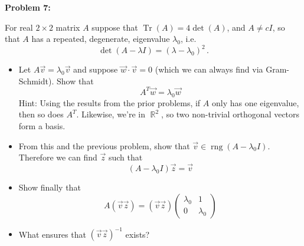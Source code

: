 \documentclass[12pt]{article}
\DeclareMathOperator{\Tr}{Tr}
\DeclareMathOperator{\RR}{\mathbb{R}}
\DeclareMathOperator{\rng}{rng}
\newenvironment{problem}[1]{
    \textbf{Problem #1:}
}{
    \rmfamily \vspace{1em}
}
\begin{document}
\begin{problem}{7}
    For real \(2 \times 2\) matrix \(A\) suppose that \(\Tr(A) = 4\det(A)\), and \(A \neq cI\), so that \(A\) has a repeated, degenerate, eigenvalue \(\lambda_0\), i.e.
    \[
        \det(A - \lambda I) = (\lambda - \lambda_0)^2\,.
    \]
    \begin{itemize}
        \item Let \(A\vec{v} = \lambda_0\vec{v}\) and suppose \(\vec{w} \cdot \vec{v} = 0\) (which we can always find
        via Gram-Schmidt). Show that
        \[
            A^T\vec{w} = \lambda_0\vec{w}
        \]
        Hint: Using the results from the prior problems, if \(A\) only has
        one eigenvalue, then so does \(A^T\). Likewise, we’re in \(\RR^2\), so two non-trivial orthogonal vectors form a basis.
        \item From this and the previous problem, show that \(\vec{v} \in \rng(A - \lambda_0I)\).
        Therefore we can find \(\vec{z}\) such that
        \[
            (A - \lambda_0I)\vec{z} = \vec{v}
        \]
        \item Show finally that
        \[
            A(\vec{v} \vec{z}) = (\vec{v} \vec{z}) \begin{pmatrix}
                \lambda_0 & 1 \\
                0 & \lambda_0
            \end{pmatrix}
        \]
        \item What ensures that \((\vec{v} \vec{z})^{-1}\) exists?
    \end{itemize}
\end{problem}
\end{document}
